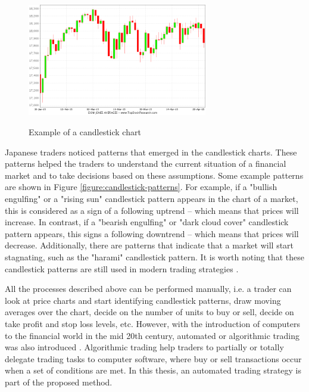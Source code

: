 \begin{figure}
\caption{Example of a candlestick chart}
\centering

\includegraphics[width=0.7\textwidth]{img/candlestick-chart.png}
\label{figure:candlestick-chart}
\end{figure}

Japanese traders noticed patterns that emerged in the candlestick charts. These
patterns helped the traders to understand the current situation of a financial
market and to take decisions based on these assumptions. Some example patterns
are shown in Figure \ref{figure:candlestick-patterns}. For example, if a
"bullish engulfing" or a "rising sun" candlestick pattern appears in the chart
of a market, this is considered as a sign of a following uptrend -- which means
that prices will increase. In contrast, if a "bearish engulfing" or "dark cloud
cover" candlestick pattern appears, this signs a following downtrend -- which
means that prices will decrease. Additionally, there are patterns that indicate
that a market will start stagnating, such as the "harami" candlestick
pattern. It is worth noting that these candlestick patterns are still used in
modern trading strategies \cite{Nison1991}.

All the processes described above can be performed manually, i.e. a trader can
look at price charts and start identifying candlestick patterns, draw moving
averages over the chart, decide on the number of units to buy or sell, decide on
take profit and stop loss levels, etc. However, with the introduction of
computers to the financial world in the mid 20th century, automated or
algorithmic trading was also introduced \cite{Hendershott2011}. Algorithmic
trading help traders to partially or totally delegate trading tasks to computer
software, where buy or sell transactions occur when a set of conditions are
met. In this thesis, an automated trading strategy is part of the proposed
method.


